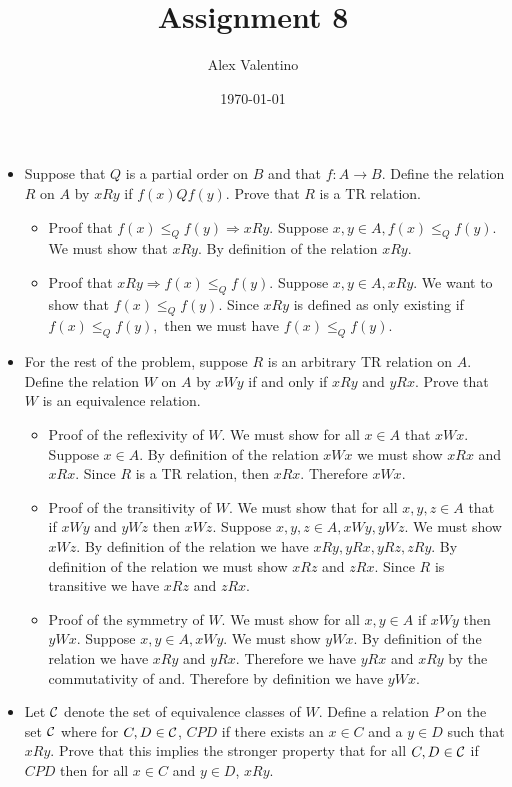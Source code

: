 \documentclass[12pt, letterpaper]{article}
\date{\today}
\author{Alex Valentino}
\title{Assignment 8}
\begin{document}
	\begin{itemize}
		\item Suppose that $Q$ is a partial order on $B$ and that $f:A \longrightarrow B$.  Define the relation $R$
on $A$ by $xRy$ if $f(x)Qf(y)$.  Prove that $R$ is a TR relation.
		\begin{itemize}
			\item Proof that $f(x) \leq_Q f(y) \Rightarrow xRy.$ Suppose $x,y \in A, f(x) \leq_Q f(y).$ We must show that $xRy$. By definition of the relation $xRy.$
			\item Proof that $xRy \Rightarrow f(x) \leq_Q f(y)$.  Suppose $x,y \in A, xRy$. We want to show that $f(x) \leq_Q f(y).$  Since $xRy$ is defined as only existing if $f(x) \leq_Q f(y),$ then we must have $f(x) \leq_Q f(y).$
		\end{itemize}
		\item For the rest of the problem, suppose $R$ is an arbitrary TR relation on $A$.  Define the relation
$W$ on $A$ by $xWy$ if and only if $xRy$ and $yRx$.  Prove that $W$ is an equivalence relation.
		\begin{itemize}
			\item Proof of the reflexivity of $W$.  We must show for all $x \in A$ that $xWx.$  Suppose $x \in A.$  By definition of the relation $xWx$ we must show $xRx$ and $xRx.$  Since $R$ is a TR relation, then $xRx.$  Therefore $xWx.$
			\item Proof of the transitivity of $W$.  We must show that for all $x,y,z \in A$ that if $xWy$ and $yWz$ then $xWz.$  Suppose $x,y,z \in A, xWy,yWz.$  We must show $xWz.$  By definition of the relation we have $xRy, yRx, yRz, zRy.$  By definition of the relation we must show $xRz$ and $zRx.$  Since $R$ is transitive we have $xRz$ and $zRx.$ 
			\item Proof of the symmetry of $W$.  We must show for all $x,y \in A$ if $xWy$ then $yWx.$  Suppose $x,y \in A, xWy.$  We must show $yWx.$  By definition of the relation we have $xRy$ and $yRx.$  Therefore we have $yRx$ and $xRy$ by the commutativity of and.    Therefore by definition we have $yWx.$
		\end{itemize}
		\item Let ${\cal C}$ denote the set of equivalence classes of $W$.  Define a relation $P$ on the
set ${\cal C}$ where for $C,D \in {\cal C}$,  $CPD$ if there exists an $x \in C$ and a $y \in D$ such that $xRy$.  Prove
that this implies the stronger property that for all $C,D \in {\cal C}$ if $CPD$ then for all $x \in C$ and $y \in D$, $xRy$.\\

\end{itemize}
\end{document}
